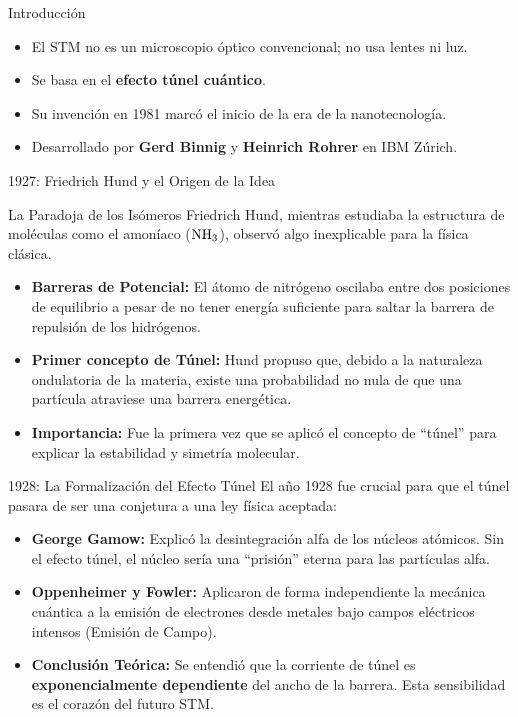 \begin{frame}{Introducción}
  \begin{itemize}
    \item El STM no es un microscopio óptico convencional; no usa lentes ni
      luz.
    \item Se basa en el \textbf{efecto túnel cuántico}.
    \item Su invención en 1981 marcó el inicio de la era de la nanotecnología.
    \item Desarrollado por \textbf{Gerd Binnig} y \textbf{Heinrich Rohrer} en
      IBM Zúrich.
  \end{itemize}
\end{frame}

\begin{frame}{1927: Friedrich Hund y el Origen de la Idea}
  \begin{block}{La Paradoja de los Isómeros}
    Friedrich Hund, mientras estudiaba la estructura de moléculas como el
    amoníaco ($\ce{NH3}$), observó algo inexplicable para la física clásica.
  \end{block}
  \begin{itemize}
    \item \textbf{Barreras de Potencial:} El átomo de nitrógeno oscilaba entre
      dos posiciones de equilibrio a pesar de no tener energía suficiente para
      saltar la barrera de repulsión de los hidrógenos.
    \item \textbf{Primer concepto de Túnel:} Hund propuso que, debido a la
      naturaleza ondulatoria de la materia, existe una probabilidad no nula de
      que una partícula atraviese una barrera energética.
    \item \textbf{Importancia:} Fue la primera vez que se aplicó el concepto de
      ``túnel'' para explicar la estabilidad y simetría molecular.
  \end{itemize}
\end{frame}

\begin{frame}{1928: La Formalización del Efecto Túnel}
  El año 1928 fue crucial para que el túnel pasara de ser una conjetura a una
  ley física aceptada:
  \begin{itemize}
    \item \textbf{George Gamow:} Explicó la desintegración alfa de los núcleos
      atómicos. Sin el efecto túnel, el núcleo sería una ``prisión'' eterna para
      las partículas alfa.
    \item \textbf{Oppenheimer y Fowler:} Aplicaron de forma independiente la
      mecánica cuántica a la emisión de electrones desde metales bajo campos
      eléctricos intensos (Emisión de Campo).
    \item \textbf{Conclusión Teórica:} Se entendió que la corriente de túnel es
      \textbf{exponencialmente dependiente} del ancho de la barrera. Esta
      sensibilidad es el corazón del futuro STM.
  \end{itemize}
\end{frame}

